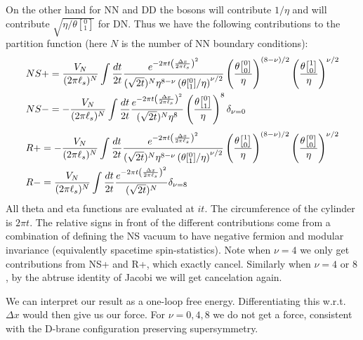 \documentclass[11pt, class=article, crop=false]{standalone}
\begin{document}
\begin{enumerate}
	On the other hand for NN and DD the bosons will contribute $1/\eta$ and will contribute $\sqrt{\eta/\theta[{^0_1}]}$ for DN. Thus we have the following contributions to the partition function (here $N$ is the number of NN boundary conditions):
	\[
		\begin{aligned}
		NS+ &= \frac{V_N}{(2 \pi \ell_s)^{N}} \int \frac{dt}{2t} \frac{e^{-2 \pi t \left(\frac{\Delta x}{2 \pi \ell_s} \right)^2}}{(\sqrt{2 t})^{N} \eta^{8-\nu} \left(\theta[{^0_1}]/\eta\right)^{\nu/2}} \left(\frac{\theta\twist00}{\eta} \right)^{(8-\nu)/2} \left(\frac{\theta\twist10}{\eta} \right)^{\nu/2} 
		\\
		NS- &= -\frac{V_N}{(2 \pi \ell_s)^{N}} \int \frac{dt}{2t} \frac{e^{-2 \pi t \left(\frac{\Delta x}{2 \pi \ell_s} \right)^2}}{(\sqrt{2 t})^{N} \eta^{8}} 
		\left(\frac{\theta\twist01}{\eta} \right)^{8} \delta_{\nu=0}
		\end{aligned}
		\]
	\[
	\begin{aligned}
	R+ &= -\frac{V_N}{(2 \pi \ell_s)^{N}} \int \frac{dt}{2t} \frac{e^{-2 \pi t \left(\frac{\Delta x}{2 \pi \ell_s} \right)^2}}{(\sqrt{2 t})^{N} \eta^{8-\nu} \left(\theta[{^0_1}]/\eta\right)^{\nu/2}} 
	\left(\frac{\theta\twist10}{\eta} \right)^{(8-\nu)/2} \left(\frac{\theta\twist00}{\eta} \right)^{\nu/2} 
	\\
	R- &= \frac{V_N}{(2 \pi \ell_s)^{N}} \int \frac{dt}{2t} \frac{e^{-2 \pi t \left(\frac{\Delta x}{2 \pi \ell_s} \right)^2}}{(\sqrt{2 t})^{N} } \delta_{\nu=8} 	
	\end{aligned}
	\]
	All theta and eta functions are evaluated at $it$. The circumference of the cylinder is $2 \pi t$. The relative signs in front of the different contributions come from a combination of defining the NS vacuum to have negative fermion and modular invariance (equivalently spacetime spin-statistics). 
%
	Note when $\nu = 4$ we only get contributions from NS+ and R+, which exactly cancel. Similarly when $\nu = 4$ or $8$, by the abtruse identity of Jacobi we will get cancelation again. 
	
	We can interpret our result as a one-loop free energy. Differentiating this w.r.t. $\Delta x$ would then give us our force. For $\nu = 0, 4, 8$ we do not get a force, consistent with the D-brane configuration preserving supersymmetry. 
	

\end{enumerate}
\end{document}
